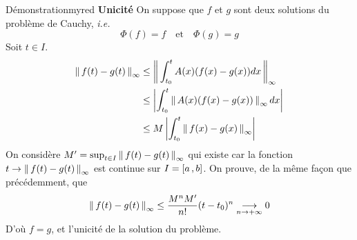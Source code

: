 \begin{omed}{Démonstration}{myred}
        \textbf{Unicité} \quad On suppose que $f$ et $g$ sont deux solutions du problème de Cauchy, \textit{i.e.} 
        \[ \Phi(f) = f \quad \text{et} \quad \Phi(g) = g \]   
        Soit $t \in I$.
        \begin{align*}
            \left\lVert\,f(t) - g(t)\,\right\rVert_{\infty} 
            &\leq \left\lVert\,\int_{t_0}^{t} A(x)(f(x) - g(x))dx\,\right\rVert_{\infty} \\
            &\leq \left\lvert \int_{t_0}^{t} \left\lVert\,A(x)(f(x) - g(x))\,\right\rVert_{\infty}dx\right\rvert \\
            &\leq M \left\lvert \int_{t_0}^{t} \left\lVert\,f(x) - g(x)\,\right\rVert_{\infty}\right\rvert
        \end{align*}
        On considère $M' = \sup_{t \in I} \left\lVert\,f(t) - g(t)\,\right\rVert_{\infty}$ qui existe car la fonction $t \to \left\lVert\,f(t) - g(t)\,\right\rVert_{\infty}$ est continue sur $I = \left[ a \, , b \right]$. On prouve, de la même façon que précédemment, que 
        \[ \left\lVert\,f(t) - g(t)\,\right\rVert_{\infty} \leq \frac{M^n M'}{n!} (t - t_0)^n \underset{n \rightarrow +\infty}{\longrightarrow} 0 \]
        D’où $f = g$, et l’unicité de la solution du problème.
    \end{omed}


